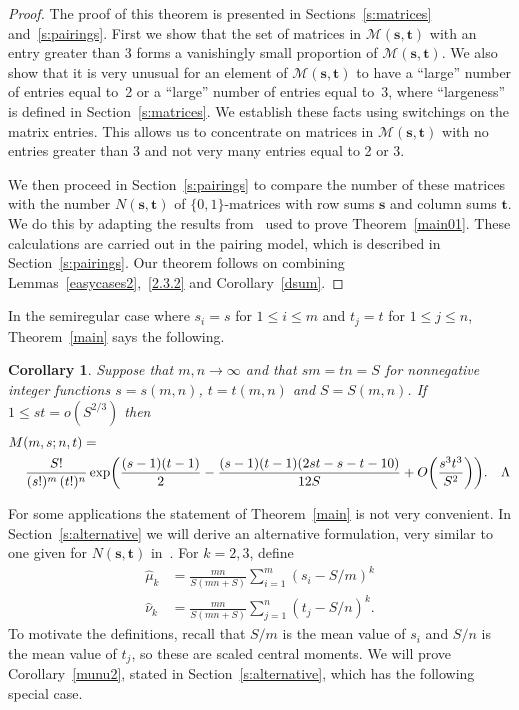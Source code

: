 \documentclass[12pt]{article}
\newtheorem{corollary}[theorem]{Corollary}
\numberwithin{equation}{section}
\def\M{{\mathcal{M}}}
\def\svec{{\boldsymbol{s}}}
\def\tvec{{\boldsymbol{t}}}
\def\Mst{{\M(\svec,\tvec)}}
\begin{document}
\begin{proof}
The proof of this theorem is presented in Sections~\ref{s:matrices}
and~\ref{s:pairings}.  
First we show that the set of matrices in $\Mst$ 
with an entry greater than 3 forms a vanishingly small proportion
of $\Mst$.   We also show that it is very unusual
for an element of $\Mst$ to have a ``large''
number of entries equal to~2 or a ``large'' number of entries equal 
to~3, where ``largeness'' is defined in Section~\ref{s:matrices}.
We establish these facts using switchings
on the matrix entries.  This allows us to 
concentrate on matrices in $\Mst$ with no entries 
greater than 3 and not very many entries equal to 2 or 3.

We then proceed in Section~\ref{s:pairings}
to compare the number of these matrices with
the number $N(\svec,\tvec)$ of $\{ 0,1\}$-matrices with row sums
$\svec$ and column sums $\tvec$.  
We do this by adapting
the results from~\cite{GMW} used to prove Theorem~\ref{main01}.
These calculations are carried out
in the pairing model, which is described in
Section~\ref{s:pairings}.   Our theorem follows
on combining Lemmas~\ref{easycases2},~\ref{2.3.2} and
Corollary~\ref{dsum}.
\end{proof}

In the semiregular case where $s_i = s$ for $1\leq i\leq m$
and $t_j = t$ for $1\leq j\leq n$, Theorem~\ref{main} says
the following.

\begin{corollary}
Suppose that $m,n\to \infty$ and that $sm=tn=S$ for
nonnegative integer functions $s=s(m,n)$, $t=t(m,n)$
and $S=S(m,n)$.
If\/ $1\le st=o(S^{2/3})$ then
\begin{align*}
M(m,s; n,t) &=\\
&\kern-15mm\frac{S!}{(s!)^m\, (t!)^n}
\exp\biggl(\frac{(s-1)(t-1)}{2} 
 - \frac{(s-1)(t-1)(2st - s - t - 10)}{12S}
 + O\biggl(\frac{s^3t^3}{S^2}\biggr)\biggr).
 \quad\qedsymbol
\end{align*}
\end{corollary}

For some applications the statement of Theorem~\ref{main}
is not very convenient.  In Section~\ref{s:alternative}
we will derive an alternative formulation,
very similar to one given for $N(\svec,\tvec)$ in~\cite{GMW}.
For $k=2,3$, define 
\begin{align*}
  \hat{\mu}_k &= \frac{mn}{S(mn+S)}\sum_{i=1}^m (s_i - S/m)^k\\[0.4ex]
  \hat{\nu}_k &= \frac{mn}{S(mn+S)}\sum_{j=1}^n (t_j - S/n)^k.
\end{align*}
To motivate the definitions, recall that $S/m$ is the mean value of $s_i$
and $S/n$ is the mean value of $t_j$, so these are scaled central moments.
We will prove Corollary~\ref{munu2}, stated in Section~\ref{s:alternative},
which has the following special case.
\end{document}
